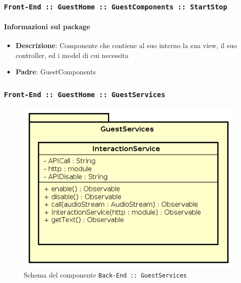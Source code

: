 \documentclass[../DefinizioneDiProdotto.tex]{subfiles}
\begin{document}
	\subsubsection{ \texttt{Front-End :: GuestHome :: GuestComponents :: StartStop}}\paragraph{Informazioni sul package}\begin{itemize}\item \textbf{Descrizione}: Componente che contiene al suo interno la sua view, il suo controller, ed i model di cui necessita\item \textbf{Padre}: GuestComponents\end{itemize}

	\newpage
	\subsubsection{ \texttt{Front-End :: GuestHome :: GuestServices}}
	\begin{figure}[!h]
		\centering
		\includegraphics[scale=0.7]{Architettura/Front-End/GuestHome/GuestServices.png}
		\caption{Schema del componente \texttt{Back-End :: GuestServices}}
	\end{figure}
\end{document}

